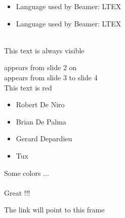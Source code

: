 \documentclass{beamer}
\begin{document}
\begin{frame}

\begin{itemize}
\item Language used by Beamer: LTEX
\item Language used by Beamer: LTEX
\end{itemize}

\end{frame}

\begin{frame}

\\
This text is always visible\\
     

\end{frame}


\begin{frame}{5}
{appears from slide 2 on\\}
{appears from slide 3 to slide 4\\}
\alert<1>{This text} \alert<2>{is} \alert<3>{red}
\end{frame}

\begin{frame}{6}
\begin{itemize}
\item <+-| alert@+> Robert De Niro
\item <+-| alert@+> Brian De Palma
\item <+-| alert@+> Gerard Depardieu
\item <+-| alert@+> Tux
\end{itemize}
\end{frame}

\begin{frame}{7}
  Some colors ...\\
 \\
Great !!!
\end{frame}

\begin{frame}[label=link]
The link will point to this frame
\end{frame}
\end{document}
